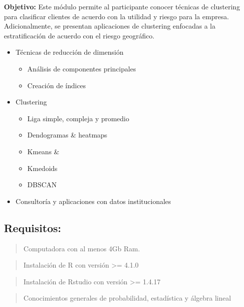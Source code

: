 \documentclass[
]{book}
\providecommand{\tightlist}{%
  \setlength{\itemsep}{0pt}\setlength{\parskip}{0pt}}
\begin{document}
\textbf{Objetivo:} Este módulo permite al participante conocer técnicas de clustering para clasificar clientes de acuerdo con la utilidad y riesgo para la empresa. Adicionalmente, se presentan aplicaciones de clustering enfocadas a la estratificación de acuerdo con el riesgo geográfico.

\begin{itemize}
\item
  Técnicas de reducción de dimensión

  \begin{itemize}
  \tightlist
  \item
    Análisis de componentes principales
  \item
    Creación de índices
  \end{itemize}
\item
  Clustering

  \begin{itemize}
  \tightlist
  \item
    Liga simple, compleja y promedio
  \item
    Dendogramas \& heatmaps
  \item
    Kmeans \&
  \item
    Kmedoids
  \item
    DBSCAN
  \end{itemize}
\item
  Consultoría y aplicaciones con datos institucionales
\end{itemize}

\hypertarget{requisitos}{%
\subsection*{Requisitos:}\label{requisitos}}

\begin{quote}
Computadora con al menos 4Gb Ram.
\end{quote}

\begin{quote}
Instalación de R con versión \textgreater= 4.1.0
\end{quote}

\begin{quote}
Instalación de Rstudio con versión \textgreater= 1.4.17
\end{quote}

\begin{quote}
Conocimientos generales de probabilidad, estadística y álgebra lineal
\end{quote}
\end{document}
